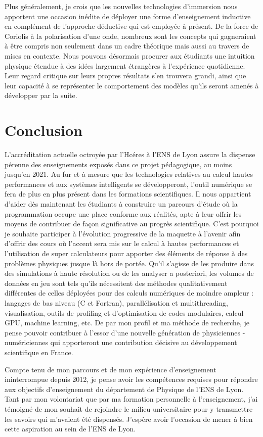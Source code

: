 \documentclass[11pt,onecolumn]{article}
\begin{document}
Plus généralement, je crois que les nouvelles technologies d'immersion nous apportent une occasion inédite de déployer une forme d'enseignement inductive en complément de l'approche déductive qui est employée à présent. De la force de Coriolis à la polarisation d'une onde, nombreux sont les concepts qui gagneraient à être compris non seulement dans un cadre théorique mais aussi au travers de mises en contexte. Nous pouvons désormais procurer aux étudiants une intuition physique étendue à des idées largement étrangères à l'expérience quotidienne. Leur regard critique sur leurs propres résultats s'en trouvera grandi, ainsi que leur capacité à se représenter le comportement des modèles qu'ils seront amenés à développer par la suite.

\section{Conclusion}

L’accréditation actuelle octroyée par l’Hcéres à l’ENS de Lyon assure la dispense pérenne des enseignements exposés dans ce projet pédagogique, au moins jusqu’en 2021. Au fur et à mesure que les technologies relatives au calcul hautes performances et aux systèmes intelligents se développeront, l'outil numérique se fera de plus en plus présent dans les formations scientifiques. Il nous appartient d’aider dès maintenant les étudiants à construire un parcours d’étude où la programmation occupe une place conforme aux réalités, apte à leur offrir les moyens de contribuer de façon significative au progrès scientifique. C’est pourquoi je souhaite participer à l’évolution progressive de la maquette à l’avenir afin d’offrir des cours où l’accent sera mis sur le calcul à hautes performances et l’utilisation de super calculateurs pour apporter des éléments de réponse à des problèmes physiques jusque là hors de portée. Qu’il s’agisse de les produire dans des simulations à haute résolution ou de les analyser a posteriori, les volumes de données en jeu sont tels qu’ils nécessitent des méthodes qualitativement différentes de celles déployées pour des calculs numériques de moindre ampleur : langages de bas niveau (C et Fortran), parallélisation et multithreading, visualisation, outils de profiling et d’optimisation de codes modulaires, calcul GPU, machine learning, etc. De par mon profil et ma méthode de recherche, je pense pouvoir contribuer à l’essor d’une nouvelle génération de physicien{\tiny \textbullet}nes - numéricien{\tiny \textbullet}nes qui apporteront une contribution décisive au développement scientifique en France. 

Compte tenu de mon parcours et de mon expérience d'enseignement ininterrompue depuis 2012, je pense avoir les compétences requises pour répondre aux objectifs d'enseignement du département de Physique de l’ENS de Lyon. Tant par mon volontariat que par ma formation personnelle à l'enseignement, j'ai témoigné de mon souhait de rejoindre le milieu universitaire pour y transmettre les savoirs qui m'avaient été dispensés. J'espère avoir l'occasion de mener à bien cette aspiration au sein de l’ENS de Lyon.
\end{document}
